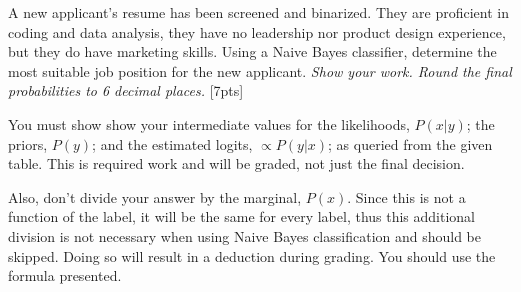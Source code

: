 A new applicant's resume has been screened and binarized. They are proficient in coding and data analysis, they have no leadership nor product design experience, but they do have marketing skills. Using a Naive Bayes classifier, determine the most suitable job position for the new applicant. \emph{Show your work. Round the final probabilities to 6 decimal places.} [7pts]

\begin{warningbox}
    You must show show your intermediate values for the likelihoods, $P(x|y)$; the priors, $P(y)$; and the estimated logits, $\propto P(y|x)$; as queried from the given table. This is required work and will be graded, not just the final decision.

    \bigskip
    Also, don't divide your answer by the marginal, $P(x)$. Since this is not a function of the label, it will be the same for every label, thus this additional division is not necessary when using Naive Bayes classification and should be skipped. Doing so will result in a deduction during grading. You should use the formula presented.
\end{warningbox}
